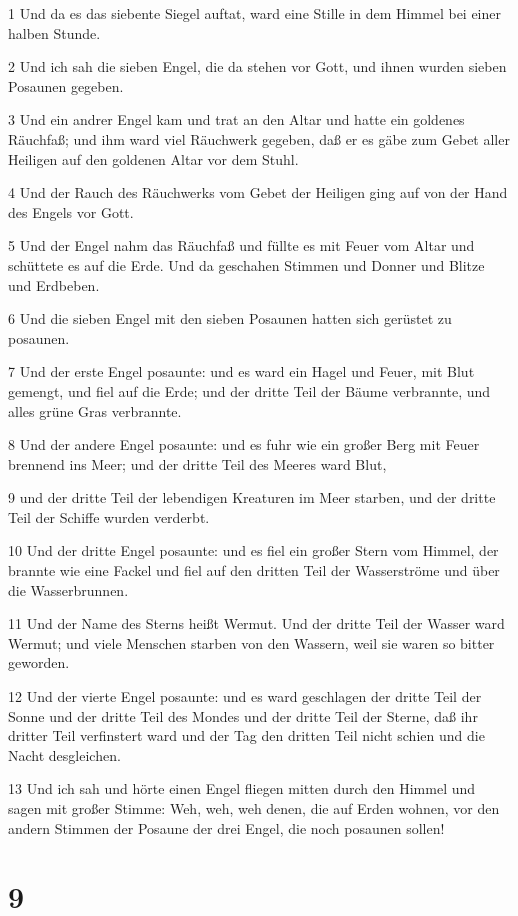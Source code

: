 \par 1 Und da es das siebente Siegel auftat, ward eine Stille in dem Himmel bei einer halben Stunde.
\par 2 Und ich sah die sieben Engel, die da stehen vor Gott, und ihnen wurden sieben Posaunen gegeben.
\par 3 Und ein andrer Engel kam und trat an den Altar und hatte ein goldenes Räuchfaß; und ihm ward viel Räuchwerk gegeben, daß er es gäbe zum Gebet aller Heiligen auf den goldenen Altar vor dem Stuhl.
\par 4 Und der Rauch des Räuchwerks vom Gebet der Heiligen ging auf von der Hand des Engels vor Gott.
\par 5 Und der Engel nahm das Räuchfaß und füllte es mit Feuer vom Altar und schüttete es auf die Erde. Und da geschahen Stimmen und Donner und Blitze und Erdbeben.
\par 6 Und die sieben Engel mit den sieben Posaunen hatten sich gerüstet zu posaunen.
\par 7 Und der erste Engel posaunte: und es ward ein Hagel und Feuer, mit Blut gemengt, und fiel auf die Erde; und der dritte Teil der Bäume verbrannte, und alles grüne Gras verbrannte.
\par 8 Und der andere Engel posaunte: und es fuhr wie ein großer Berg mit Feuer brennend ins Meer; und der dritte Teil des Meeres ward Blut,
\par 9 und der dritte Teil der lebendigen Kreaturen im Meer starben, und der dritte Teil der Schiffe wurden verderbt.
\par 10 Und der dritte Engel posaunte: und es fiel ein großer Stern vom Himmel, der brannte wie eine Fackel und fiel auf den dritten Teil der Wasserströme und über die Wasserbrunnen.
\par 11 Und der Name des Sterns heißt Wermut. Und der dritte Teil der Wasser ward Wermut; und viele Menschen starben von den Wassern, weil sie waren so bitter geworden.
\par 12 Und der vierte Engel posaunte: und es ward geschlagen der dritte Teil der Sonne und der dritte Teil des Mondes und der dritte Teil der Sterne, daß ihr dritter Teil verfinstert ward und der Tag den dritten Teil nicht schien und die Nacht desgleichen.
\par 13 Und ich sah und hörte einen Engel fliegen mitten durch den Himmel und sagen mit großer Stimme: Weh, weh, weh denen, die auf Erden wohnen, vor den andern Stimmen der Posaune der drei Engel, die noch posaunen sollen!

\chapter{9}

